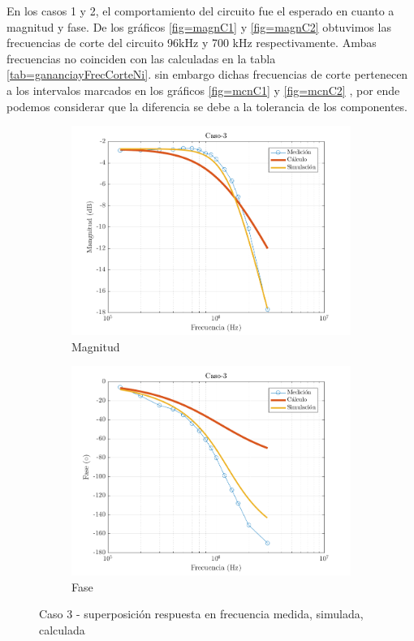 \documentclass[../../main.tex]{subfiles}
\begin{document}
En los casos 1 y 2, el comportamiento del circuito fue el esperado en cuanto a magnitud y fase. De los gráficos \ref{fig=magnC1} y \ref{fig=magnC2} obtuvimos las frecuencias de corte del circuito 96kHz y 700 kHz respectivamente. Ambas frecuencias no coinciden con las calculadas en la tabla \ref{tab=gananciayFrecCorteNi}. sin embargo dichas frecuencias de corte pertenecen a los intervalos marcados en los gráficos \ref{fig=mcnC1} y \ref{fig=mcnC2} , por ende podemos considerar que la diferencia se debe a la tolerancia de los componentes.

\begin{figure}[H]
\centering
\begin{subfigure}[http]{0.49\textwidth}
\includegraphics[width=\textwidth]{Caso-3_mag_n}
\caption{Magnitud}\label{fig=magnC3}
\end{subfigure}
\begin{subfigure}[http]{0.49\textwidth}
\includegraphics[width=\textwidth]{Caso-3_fase_n}
\caption{Fase}
\end{subfigure}
\caption{Caso 3 - superposición respuesta en  frecuencia medida, simulada, calculada}\label{fig=bodeC3}
\end{figure}
\end{document}
